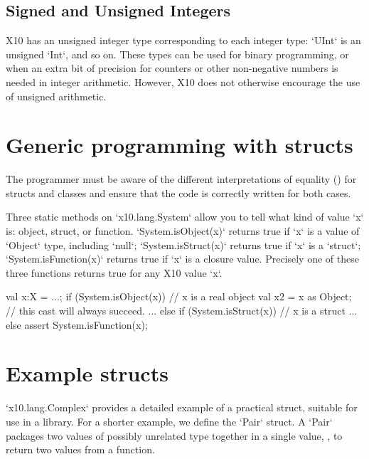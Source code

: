 \subsection{Signed and Unsigned Integers}

X10 has an unsigned integer type corresponding to each integer type:
\xcd`UInt` is an unsigned \xcd`Int`, and so on. These types can be used for
binary programming, or when an extra bit of precision for counters or other
non-negative numbers is needed in integer arithmetic. However, X10 does not
otherwise encourage the use of unsigned arithmetic.




 
\section{Generic programming with structs}



The programmer must be aware of the different interpretations of
equality () for structs and classes and ensure that the
code is correctly written for both cases. 

Three static methods on \xcd`x10.lang.System` 
allow you to tell what kind of value \xcd`x` is: object,
struct, or function.  
\xcd`System.isObject(x)` returns true if \xcd`x` is a value of \xcd`Object`
type, including \xcd`null`; \xcd`System.isStruct(x)` returns true if \xcd`x`
is a \xcd`struct`; \xcd`System.isFunction(x)` returns true if \xcd`x` is a
closure value.  Precisely one of these three functions returns true for any
X10 value \xcd`x`.  

\begin{xten}
val x:X = ...;
if (System.isObject(x)) { // x is a real object
   val x2 = x as Object; // this cast will always succeed.
   ...
} else if (System.isStruct(x)) { // x is a struct
   ...
} else {  
  assert System.isFunction(x);
}
\end{xten}
 
  
\section{Example structs}

\xcd`x10.lang.Complex` provides a detailed example of a practical struct,
suitable for use in a library.  For a shorter example, we define the
\xcd`Pair` struct.   A \xcd`Pair` packages
two values of possibly unrelated type together in a single value, \eg, to
return two values from a function.  

